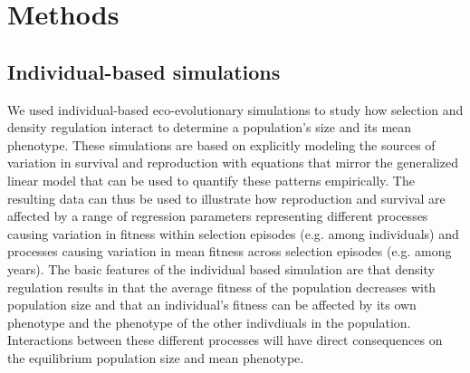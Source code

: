 \documentclass{article}
\begin{document}
\section{Methods}
\subsection{Individual-based simulations}

We used individual-based eco-evolutionary simulations to study how selection and density regulation interact to determine a population's size and its mean phenotype. These simulations are based on explicitly modeling the sources of variation in survival and reproduction with equations that mirror the generalized linear model that can be used to quantify these patterns empirically. The resulting data can thus be used to illustrate how reproduction and survival are affected by a range of regression parameters representing different processes causing variation in fitness within selection episodes (e.g. among individuals) and processes causing variation in mean fitness across selection episodes (e.g. among years). The basic features of the individual based simulation are that density regulation results in that the average fitness of the population decreases with population size and that an individual's fitness can be affected by its own phenotype and the phenotype of the other indivdiuals in the population. Interactions between these different processes will have direct consequences on the equilibrium population size and mean phenotype. 
\end{document}
